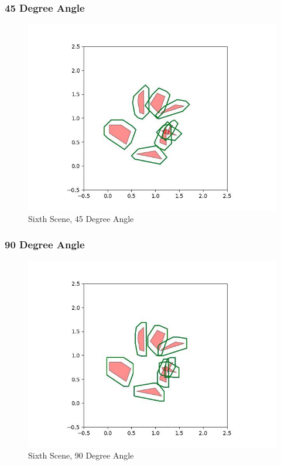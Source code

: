 \documentclass{article}
\begin{document}
\newpage
\subsubsection{45 Degree Angle}
\begin{figure}[h!]
	\includegraphics[width= 0.9 \linewidth]{Problem3_minkowski6_45.jpg}
	\centering
	\caption{Sixth Scene, 45 Degree Angle}
	\label{Problem3_minkowski6_45.jpg}
\end{figure}

\newpage
\subsubsection{90 Degree Angle}
\begin{figure}[h!]
	\includegraphics[width= 0.9 \linewidth]{Problem3_minkowski6_90.jpg}
	\centering
	\caption{Sixth Scene, 90 Degree Angle}
	\label{Problem3_minkowski6_90.jpg}
\end{figure}
\end{document}
